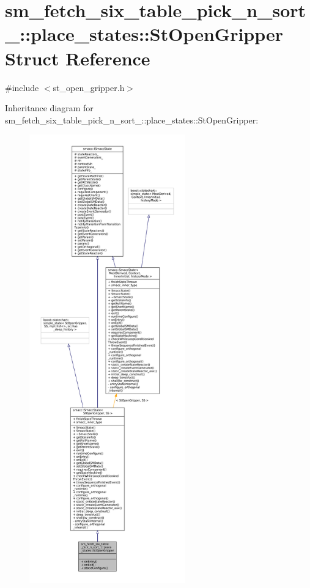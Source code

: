 \hypertarget{structsm__fetch__six__table__pick__n__sort__1_1_1place__states_1_1StOpenGripper}{}\section{sm\+\_\+fetch\+\_\+six\+\_\+table\+\_\+pick\+\_\+n\+\_\+sort\+\_\+:\+:place\+\_\+states\+:\+:St\+Open\+Gripper Struct Reference}
\label{structsm__fetch__six__table__pick__n__sort__1_1_1place__states_1_1StOpenGripper}


{\ttfamily \#include $<$st\+\_\+open\+\_\+gripper.\+h$>$}



Inheritance diagram for sm\+\_\+fetch\+\_\+six\+\_\+table\+\_\+pick\+\_\+n\+\_\+sort\+\_\+:\+:place\+\_\+states\+:\+:St\+Open\+Gripper\+:
\nopagebreak
\begin{figure}[H]
\begin{center}
\leavevmode
\includegraphics[height=550pt]{structsm__fetch__six__table__pick__n__sort__1_1_1place__states_1_1StOpenGripper__inherit__graph}
\end{center}
\end{figure}


